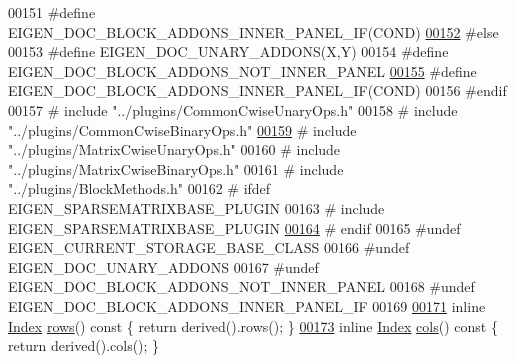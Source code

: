 \begin{DoxyCode}
00151 \textcolor{preprocessor}{#define EIGEN\_DOC\_BLOCK\_ADDONS\_INNER\_PANEL\_IF(COND) }
\hyperlink{group___sparse_core___module_a9db4c184e2222d0c9a945a191251d710}{00152} \textcolor{preprocessor}{#else}
00153 \textcolor{preprocessor}{#define EIGEN\_DOC\_UNARY\_ADDONS(X,Y)}
00154 \textcolor{preprocessor}{#define EIGEN\_DOC\_BLOCK\_ADDONS\_NOT\_INNER\_PANEL}
\hyperlink{group___sparse_core___module_a47a21ed23d5d10618ac0aca93903a32e}{00155} \textcolor{preprocessor}{#define EIGEN\_DOC\_BLOCK\_ADDONS\_INNER\_PANEL\_IF(COND)}
00156 \textcolor{preprocessor}{#endif}
00157 \textcolor{preprocessor}{#   include "../plugins/CommonCwiseUnaryOps.h"}
00158 \textcolor{preprocessor}{#   include "../plugins/CommonCwiseBinaryOps.h"}
\hyperlink{group___sparse_core___module_ad48496ebbfcd6cb685f893246de1d934}{00159} \textcolor{preprocessor}{#   include "../plugins/MatrixCwiseUnaryOps.h"}
00160 \textcolor{preprocessor}{#   include "../plugins/MatrixCwiseBinaryOps.h"}
00161 \textcolor{preprocessor}{#   include "../plugins/BlockMethods.h"}
00162 \textcolor{preprocessor}{#   ifdef EIGEN\_SPARSEMATRIXBASE\_PLUGIN}
00163 \textcolor{preprocessor}{#     include EIGEN\_SPARSEMATRIXBASE\_PLUGIN}
\hyperlink{group___sparse_core___module_aba4d0025dccf8a02d33b76c241e0625a}{00164} \textcolor{preprocessor}{#   endif}
00165 \textcolor{preprocessor}{#undef EIGEN\_CURRENT\_STORAGE\_BASE\_CLASS}
00166 \textcolor{preprocessor}{#undef EIGEN\_DOC\_UNARY\_ADDONS}
00167 \textcolor{preprocessor}{#undef EIGEN\_DOC\_BLOCK\_ADDONS\_NOT\_INNER\_PANEL}
00168 \textcolor{preprocessor}{#undef EIGEN\_DOC\_BLOCK\_ADDONS\_INNER\_PANEL\_IF}
00169 
\hyperlink{group___sparse_core___module_a1944e9fa9ce7937bfc3a87b2cb94371f}{00171}     \textcolor{keyword}{inline} \hyperlink{group___core___module_a554f30542cc2316add4b1ea0a492ff02}{Index} \hyperlink{group___sparse_core___module_a1944e9fa9ce7937bfc3a87b2cb94371f}{rows}()\textcolor{keyword}{ const }\{ \textcolor{keywordflow}{return} derived().rows(); \}
\hyperlink{group___sparse_core___module_aca7ce296424ef6e478ab0fb19547a7ee}{00173}     \textcolor{keyword}{inline} \hyperlink{group___core___module_a554f30542cc2316add4b1ea0a492ff02}{Index} \hyperlink{group___sparse_core___module_aca7ce296424ef6e478ab0fb19547a7ee}{cols}()\textcolor{keyword}{ const }\{ \textcolor{keywordflow}{return} derived().cols(); \}

\end{DoxyCode}
